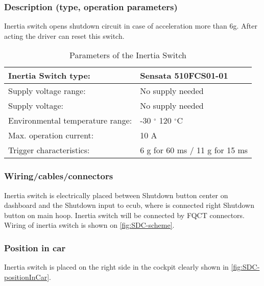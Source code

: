 \subsubsection{Description (type, operation parameters)}
\iffalse Describe the Inertia Switch used and use a table for the common operation parameters, like supply voltage, temperature, etc.
Additionally, fill out the following table replacing the values with your specification: \fi

Inertia switch opens shutdown circuit in case of acceleration more than 6g. After acting the driver can reset this switch.
\begin{table}[H]
	\centering
	\caption{Parameters of the Inertia Switch}
	\begin{tabularx}{\textwidth}{|X|l|}
	\hline	Inertia Switch type: & Sensata 510FCS01-01 \\[\TableSize]
	\hline	Supply voltage range: & No supply needed \\[\TableSize]
	\hline	Supply voltage: & No supply needed \\[\TableSize]
	\hline	Environmental temperature range: & -30 $^\circ$ 120 $^\circ$C \\[\TableSize]
	\hline	Max. operation current: & 10 A \\[\TableSize]
	\hline	Trigger characteristics: & 6 g for 60 ms / 11 g for 15 ms \\[\TableSize]
	\hline
	\end{tabularx}%
	\label{tab:inertiaSwitch}%
\end{table}%


\subsubsection{Wiring/cables/connectors}

Inertia switch is electrically placed between Shutdown button center on dashboard and the Shutdown input to \gls{ecub}, where is connected right Shutdown button on main hoop. Inertia switch will be connected by FQCT connectors. Wiring of inertia switch is shown on \ref{fig:SDC-scheme}.

\subsubsection{Position in car}

Inertia switch is placed on the right side in the cockpit clearly shown in \ref{fig:SDC-positionInCar}.